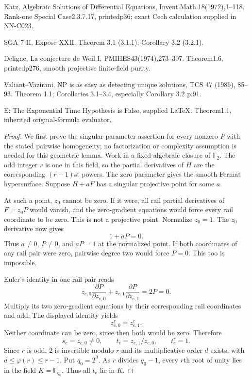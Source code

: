Katz, Algebraic Solutions of Differential Equations, Invent.Math.18(1972),1--118. Rank-one Special Case2.3.7.17, printedp36; exact Cech calculation supplied in NN-C023.

SGA 7 II, Expose XXII. Theorem 3.1 (3.1.1); Corollary 3.2 (3.2.1).

Deligne, La conjecture de Weil I, PMIHES43(1974),273--307. Theorem1.6, printedp276, smooth projective finite-field purity.

Valiant--Vazirani, NP is as easy as detecting unique solutions, TCS 47 (1986), 85--93. Theorem 1.1; Corollaries 3.1--3.4, especially Corollary 3.2 p.91.

E: The Exponential Time Hypothesis is False, supplied LaTeX. Theorem1.1, inherited original-formula evaluator.

\begin{proof}
We first prove the singular-parameter assertion for every nonzero $P$ with the stated pairwise homogeneity; no factorization or complexity assumption is needed for this geometric lemma. Work in a fixed algebraic closure of $\mathbb F_2$. The odd integer $r$ is one in this field, so the partial derivatives of $H$ are the corresponding $(r-1)$st powers. The zero parameter gives the smooth Fermat hypersurface. Suppose $H+aF$ has a singular projective point for some $a$.

At such a point, $z_0$ cannot be zero. If it were, all rail partial derivatives of $F=z_0P$ would vanish, and the zero-gradient equations would force every rail coordinate to be zero. This is not a projective point. Normalize $z_0=1$. The $z_0$ derivative now gives
\[
                              1+aP=0.
\]
Thus $a\ne0$, $P\ne0$, and $aP=1$ at the normalized point. If both coordinates of any rail pair were zero, pairwise degree two would force $P=0$. This too is impossible.

Euler's identity in one rail pair reads
\[
 z_{e,0}\frac{\partial P}{\partial z_{e,0}}
 +z_{e,1}\frac{\partial P}{\partial z_{e,1}}=2P=0.
\]
Multiply its two zero-gradient equations by their corresponding rail coordinates and add. The displayed identity yields
\[
                         z_{e,0}^r=z_{e,1}^r.
\]
Neither coordinate can be zero, since then both would be zero. Therefore
\[
              s_e=z_{e,0}\ne0,\qquad
              t_e=z_{e,1}/z_{e,0},\qquad t_e^r=1.
\]
Since $r$ is odd, $2$ is invertible modulo $r$ and its multiplicative order $d$ exists, with $d\leq\varphi(r)\leq r-1$. Put $q_0=2^d$. As $r$ divides $q_0-1$, every $r$th root of unity lies in the field $K=\mathbb F_{q_0}$. Thus all $t_e$ lie in $K$.


\end{proof}
